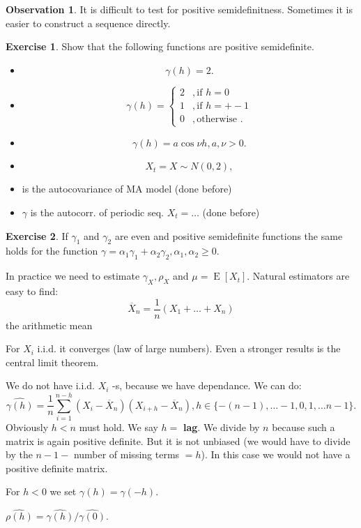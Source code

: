 \documentclass[12pt,a4paper, notitlepage]{book}
\theoremstyle{definition} %
\newtheorem{exercise}{Exercise}[chapter]
\newtheorem*{observation}{Observation}
\theoremstyle{plain} %
\DeclareMathOperator{\E}{E}
\begin{document}
\begin{observation}
It is difficult to test for positive semidefinitness. Sometimes it is easier to construct a sequence directly.
\end{observation}

\begin{exercise}
Show that the following functions are positive semidefinite.
\begin{itemize}
\item \[ \gamma(h) = 2 . \]
\item \[ \gamma(h) = \begin{cases} 2 & , \text{if } h = 0 \\
  1 & , \text{if } h = +-1 \\
 0 &  ,  \text{otherwise } . \end{cases} \]
\item \[ \gamma(h) = a \cos{\nu h}, a, \nu > 0 . \]
\end{itemize}
\begin{itemize}
\item  \[ X_t = X \sim N(0,2) , \]
\item is the autocovariance of MA model (done before)
\item $\gamma$ is the autocorr. of periodic seq. $X_t = \dots$ (done before)
\end{itemize}


\end{exercise}

\begin{exercise}
If $\gamma_1$ and $\gamma_2$ are even and positive semidefinite functions the same holds for the function 
$\gamma = \alpha_1 \gamma_1 + \alpha_2 \gamma_2, \alpha_1, \alpha_2 \geq 0$. 


In practice we need to estimate $\gamma_X, \rho_X$ and $\mu = \E[X_t]$. Natural estimators are easy to find:
\[ \overline{X} _n = \frac{1}{n} \left(X_1 + \dots + X_n \right) \]  the arithmetic mean

For  $X_i $ i.i.d. it converges (law of large numbers). Even a stronger results is the central limit theorem.

We do not have i.i.d. $ X_ i $ -s, because we have dependance. We can do:
\[ \hat{\gamma(h)} =  \frac{1}{n} \sum_{i = 1}^{n- h}   (X_i - \overline{X}_n)(X_{i+h} - \overline{X}_n) , h \in \{ -(n-1), \ldots -1, 0, 1, \ldots n-1 \} . \]
Obviously $h < n$ must hold. We say $h =$ {\bf  lag}.
We divide by $n$ because such a matrix is again positive definite. But it is not unbiased (we would have to divide 
by the $n - 1 - $ number of missing terms $= h$). In this case we would not have a positive definite matrix. 

For $h < 0$ we set $\gamma(h) = \gamma(-h)$.

$\hat{\rho(h)} = \hat{\gamma(h)} / \hat{\gamma(0)}$.

\end{exercise}
\end{document}
